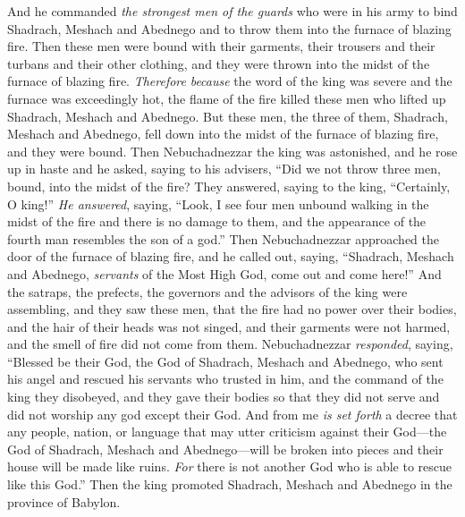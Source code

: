 \begin{biblechapter}
\verse And he commanded \textit{the strongest men of the guards} who were in his army to bind Shadrach, Meshach and Abednego and to throw them into the furnace of blazing fire.
\verse Then these men were bound with their garments, their trousers and their turbans and their other clothing, and they were thrown into the midst of the furnace of blazing fire.
\verse \textit{Therefore} \textit{because} the word of the king was severe and the furnace was exceedingly hot, the flame of the fire killed these men who lifted up Shadrach, Meshach and Abednego.
\verse But these men, the three of them, Shadrach, Meshach and Abednego, fell down into the midst of the furnace of blazing fire, and they were bound.
\verse Then Nebuchadnezzar the king was astonished, and he rose up in haste and he asked, saying to his advisers, “Did we not throw three men, bound, into the midst of the fire? They answered, saying to the king, “Certainly, O king!”
\verse \textit{He answered}, saying, “Look, I see four men unbound walking in the midst of the fire and there is no damage to them, and the appearance of the fourth man resembles the son of a god.”
\verse Then Nebuchadnezzar approached the door of the furnace of blazing fire, and he called out, saying, “Shadrach, Meshach and Abednego, \textit{servants} of the Most High God, come out and come here!”
\verse And the satraps, the prefects, the governors and the advisors of the king were assembling, and they saw these men, that the fire had no power over their bodies, and the hair of their heads was not singed, and their garments were not harmed, and the smell of fire did not come from them.
 Nebuchadnezzar \textit{responded}, saying, “Blessed be their God, the God of Shadrach, Meshach and Abednego, who sent his angel and rescued his servants who trusted in him, and the command of the king they disobeyed, and they gave their bodies so that they did not serve and did not worship any god except their God.
\verse And from me \textit{is set forth} a decree that any people, nation, or language that may utter criticism against their God—the God of Shadrach, Meshach and Abednego—will be broken into pieces and their house will be made like ruins. \textit{For} there is not another God who is able to rescue like this God.”
\verse Then the king promoted Shadrach, Meshach and Abednego in the province of Babylon.
\end{biblechapter}


